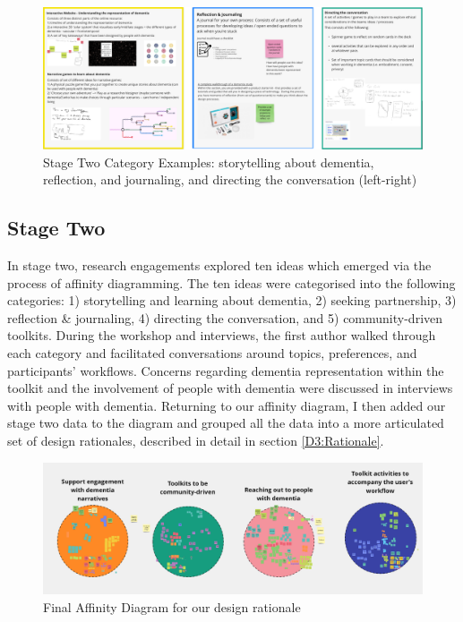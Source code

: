 \begin{figure}
\centering
\includegraphics[width=1\linewidth]{Images/D3Toolkit/Fig2.png}
\caption{Stage Two Category Examples: storytelling about dementia, reflection, and journaling, and directing the conversation (left-right)}
\label{fig:StageTwoDesigns}
\end{figure}

\subsection{Stage Two}
In stage two, research engagements explored ten ideas which emerged via the process of affinity diagramming. The ten ideas were categorised into the following categories: 1) storytelling and learning about dementia, 2) seeking partnership, 3) reflection \& journaling, 4) directing the conversation, and 5) community-driven toolkits. During the workshop and interviews, the first author walked through each category and facilitated conversations around topics, preferences, and participants’ workflows. Concerns regarding dementia representation within the toolkit and the involvement of people with dementia were discussed in interviews with people with dementia. Returning to our affinity diagram, I then added our stage two data to the diagram and grouped all the data into a more articulated set of design rationales, described in detail in section \ref{D3:Rationale}.

\begin{figure}
\centering
\includegraphics[width=1\linewidth]{Images/D3Toolkit/Fig3.png}
\caption{Final Affinity Diagram for our design rationale}
\label{fig:AffinityDiagram}
\end{figure}

